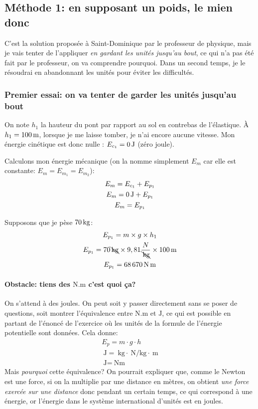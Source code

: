 \subsection{Méthode 1: en supposant un poids, le mien donc}
C'est la solution proposée à Saint-Dominique par le professeur de physique, mais je vais tenter de l'appliquer \textit{en gardant les unités jusqu'au bout}, ce qui n'a pas été fait par le professeur, on va comprendre pourquoi. Dans un second temps, je le résoudrai en abandonnant les unités pour éviter les difficultés.

\subsubsection{Premier essai: on va tenter de garder les unités jusqu'au bout}

On note $h_1$ la hauteur du pont par rapport au sol en contrebas de l'élastique. À $h_1=100\,\mathrm{m}$, lorsque je me laisse tomber, je n’ai encore aucune vitesse. Mon énergie cinétique est donc nulle : $E_{c_1} = 0\,\mathrm{J}$ (zéro joule).

Calculons mon énergie mécanique (on la nomme simplement $E_m$ car elle est constante: $E_m = E_{m_1} = E_{m_2}$):
\begin{gather*}
    E_m = E_{c_1} + E_{p_1} \\
    E_m = 0\,\mathrm{J }+ E_{p_1} \\
    E_m = E_{p_1}
\end{gather*}

Supposons que je pèse $70\,\mathrm{kg}$:
\begin{gather*}
    E_{p_1} = m \times g \times h_1 \\
    E_{p_1} = 70\bcancel{\,\mathrm{kg}} \times 9,81{\frac{N}{\bcancel{\,\mathrm{kg}}}} \times 100\,\mathrm{m} \\
    E_{p_1} = \SI{68670}{\newton\meter} \\
\end{gather*}

\paragraph{Obstacle: tiens des $\mathrm{N.m}$ c'est quoi ça?}
On s'attend à des joules. On peut soit y passer directement sans se poser de questions, soit montrer l'équivalence entre $\mathrm{N.m}$ et $\mathrm{J}$, ce qui est possible en partant de l'énoncé de l'exercice où les unités de la formule de l'énergie potentielle sont données. Cela  donne:
\begin{gather*}
    E_p = m \cdot g \cdot h \\
    \SI{}{\joule} = \SI{}{\kg} \cdot \SI{}{\newton\per\kg} \cdot \SI{}{\meter} \\
    \boxed{\SI{}{\joule} = \SI{}{\newton\meter}}
\end{gather*}
Mais \textit{pourquoi} cette équivalence? On pourrait expliquer que, comme le Newton est une force, si on la multiplie par une distance en mètres, on obtient \textit{une force exercée sur une distance} donc pendant un certain temps, ce qui correspond à une énergie, or l'énergie dans le système international d'unités est en joules.
